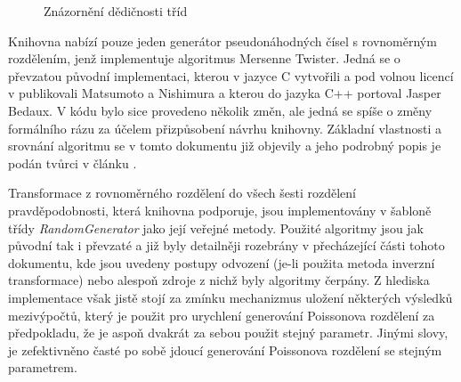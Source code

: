 \documentclass[a4paper,11pt]{article}
\begin{document}
\begin{figure}[h]
\begin{center}
\caption{\label{diagram2}Znázornění dědičnosti tříd}
\end{center}
\end{figure}

Knihovna nabízí pouze jeden generátor pseudonáhodných čísel s rovnoměrným rozdělením, jenž implementuje algoritmus Mersenne Twister. Jedná se o převzatou původní implementaci, kterou v jazyce C vytvořili a pod volnou licencí v \cite{Matsumoto} publikovali Matsumoto a Nishimura a kterou do jazyka C++ portoval Jasper Bedaux. V kódu bylo sice provedeno několik změn, ale jedná se spíše o změny formálního rázu za účelem přizpůsobení návrhu knihovny. Základní vlastnosti a srovnání algoritmu se v tomto dokumentu již objevily a jeho podrobný popis je podán tvůrci v článku \cite{Matsumoto}.

Transformace z rovnoměrného rozdělení do všech šesti rozdělení pravděpodobnosti, která knihovna podporuje, jsou implementovány v šabloně třídy \emph{RandomGenerator} jako její veřejné metody. Použité algoritmy jsou jak původní tak i převzaté a již byly detailněji rozebrány v přecházející části tohoto dokumentu, kde jsou uvedeny postupy odvození (je-li použita metoda inverzní transformace) nebo alespoň zdroje z nichž byly algoritmy čerpány. Z hlediska implementace však jistě stojí za zmínku mechanizmus uložení některých výsledků mezivýpočtů, který je použit pro urychlení generování Poissonova rozdělení za předpokladu, že je aspoň dvakrát za sebou použit stejný parametr. Jinými slovy, je zefektivněno časté po sobě jdoucí generování Poissonova rozdělení se stejným parametrem.
\end{document}
